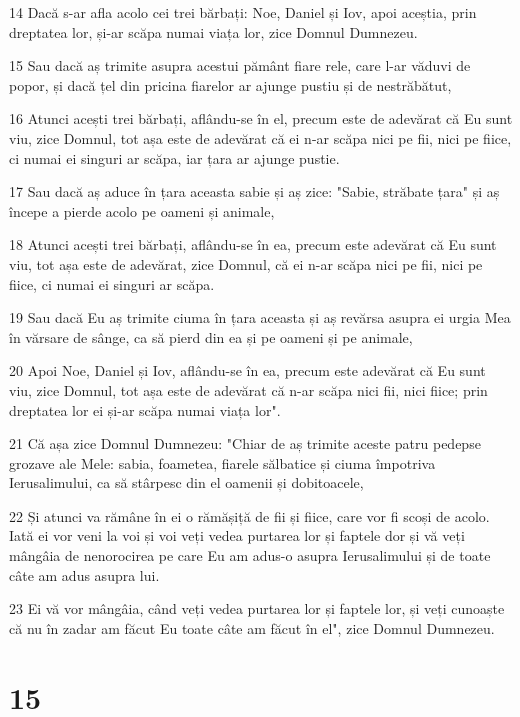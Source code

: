 \par 14 Dacă s-ar afla acolo cei trei bărbați: Noe, Daniel și Iov, apoi aceștia, prin dreptatea lor, și-ar scăpa numai viața lor, zice Domnul Dumnezeu.
\par 15 Sau dacă aș trimite asupra acestui pământ fiare rele, care l-ar văduvi de popor, și dacă țel din pricina fiarelor ar ajunge pustiu și de nestrăbătut,
\par 16 Atunci acești trei bărbați, aflându-se în el, precum este de adevărat că Eu sunt viu, zice Domnul, tot așa este de adevărat că ei n-ar scăpa nici pe fii, nici pe fiice, ci numai ei singuri ar scăpa, iar țara ar ajunge pustie.
\par 17 Sau dacă aș aduce în țara aceasta sabie și aș zice: "Sabie, străbate țara" și aș începe a pierde acolo pe oameni și animale,
\par 18 Atunci acești trei bărbați, aflându-se în ea, precum este adevărat că Eu sunt viu, tot așa este de adevărat, zice Domnul, că ei n-ar scăpa nici pe fii, nici pe fiice, ci numai ei singuri ar scăpa.
\par 19 Sau dacă Eu aș trimite ciuma în țara aceasta și aș revărsa asupra ei urgia Mea în vărsare de sânge, ca să pierd din ea și pe oameni și pe animale,
\par 20 Apoi Noe, Daniel și Iov, aflându-se în ea, precum este adevărat că Eu sunt viu, zice Domnul, tot așa este de adevărat că n-ar scăpa nici fii, nici fiice; prin dreptatea lor ei și-ar scăpa numai viața lor".
\par 21 Că așa zice Domnul Dumnezeu: "Chiar de aș trimite aceste patru pedepse grozave ale Mele: sabia, foametea, fiarele sălbatice și ciuma împotriva Ierusalimului, ca să stârpesc din el oamenii și dobitoacele,
\par 22 Și atunci va rămâne în ei o rămășiță de fii și fiice, care vor fi scoși de acolo. Iată ei vor veni la voi și voi veți vedea purtarea lor și faptele dor și vă veți mângâia de nenorocirea pe care Eu am adus-o asupra Ierusalimului și de toate câte am adus asupra lui.
\par 23 Ei vă vor mângâia, când veți vedea purtarea lor și faptele lor, și veți cunoaște că nu în zadar am făcut Eu toate câte am făcut în el", zice Domnul Dumnezeu.

\chapter{15}

